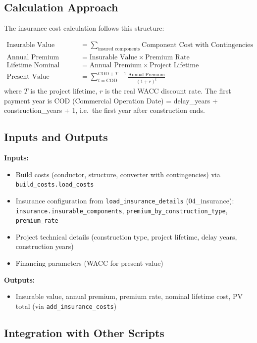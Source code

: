 \documentclass[ctcc_full_documentation.tex]{subfiles}
\begin{document}
\subsection{Calculation Approach}

The insurance cost calculation follows this structure:

\begin{align}
\text{Insurable Value} &= \sum_{\text{insured components}} \text{Component Cost with Contingencies} \\
\text{Annual Premium} &= \text{Insurable Value} \times \text{Premium Rate} \\
\text{Lifetime Nominal Cost} &= \text{Annual Premium} \times \text{Project Lifetime} \\
\text{Present Value} &= \sum_{t=\text{COD}}^{\text{COD}+T-1} \frac{\text{Annual Premium}}{(1 + r)^t}
\end{align}
where $T$ is the project lifetime, $r$ is the real WACC discount rate. The first payment year is COD (Commercial Operation Date) = delay\_years + construction\_years + 1, i.e.\ the first year after construction ends.

\subsection{Inputs and Outputs}

\textbf{Inputs:}
\begin{itemize}
    \item Build costs (conductor, structure, converter with contingencies) via \texttt{build\_costs.load\_costs}
    \item Insurance configuration from \texttt{load\_insurance\_details} (04\_insurance): \texttt{insurance.insurable\_components}, \texttt{premium\_by\_construction\_type}, \texttt{premium\_rate}
    \item Project technical details (construction type, project lifetime, delay years, construction years)
    \item Financing parameters (WACC for present value)
\end{itemize}

\textbf{Outputs:}
\begin{itemize}
    \item Insurable value, annual premium, premium rate, nominal lifetime cost, PV total (via \texttt{add\_insurance\_costs})
\end{itemize}

\subsection{Integration with Other Scripts}
\end{document}
